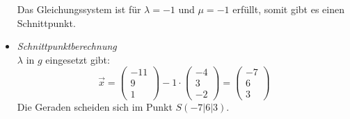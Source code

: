 \documentclass{ajc}
\numberwithin{equation}{subsection}
\begin{document}
\begin{itemize}
		Das Gleichungssystem ist für $\lambda = -1$ und $\mu = -1$ erfüllt, somit gibt es einen Schnittpunkt. \\
		\item \textit{Schnittpunktberechnung} \\
		$\lambda$ in $g$ eingesetzt gibt: 
		\begin{equation}
			\overrightarrow{x}=\left(\begin{array}{r} -11 \\ 9 \\ 1\end{array}\right) -1 \cdot \left(\begin{array}{r} -4 \\ 3 \\ -2\end{array}\right) = \left(\begin{array}{r} -7 \\ 6 \\ 3\end{array}\right)
		\end{equation}
		Die Geraden scheiden sich im Punkt $S(-7|6|3)$.
	\end{itemize}
	
\end{document}
